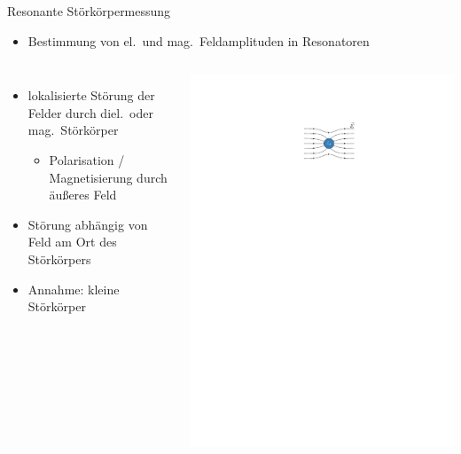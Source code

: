 \documentclass[12pt,xcolor=dvipsnames,professionalfonts]{beamer}
\begin{document}
\begin{frame}{Resonante Störkörpermessung}
	\begin{itemize}
		\item Bestimmung von el.\ und mag.\ Feldamplituden in Resonatoren
	\end{itemize}
	\vspace*{0.12cm}
	\begin{columns}[c,onlytextwidth]
		\begin{itemize}
			\setlength\itemsep{1.25em}
			\item lokalisierte Störung der Felder durch diel.\ oder mag.\ Störkörper
			\begin{itemize}
				\item Polarisation / Magnetisierung durch äußeres Feld
			\end{itemize}

			\item Störung abhängig von Feld am Ort des Störkörpers
			
			\item Annahme: kleine Störkörper
		
	\end{itemize}
		\centering
		\includegraphics[scale=1.0]{./figures/stoerung.pdf}
		
	\end{columns}

\end{frame}
\end{document}
